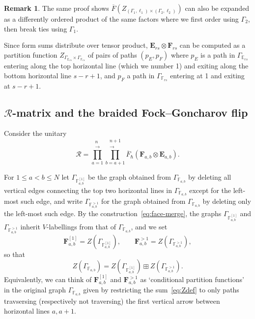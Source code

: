 \documentclass[11pt, reqno]{amsart}
\theoremstyle{definition}
\newtheorem{remark}[theorem]{Remark}
\numberwithin{equation}{section}
\def\beq{\begin{equation}}
\def\eeq{\end{equation}}
\def\Rc{\mathcal R}
\def\stgE{\mathbf{E}}
\def\stgF{\mathbf{F}}
\begin{document}
\begin{remark}
The same proof shows $\overline{F}(Z_{(\Gamma_{1},\ell_1)\times (\Gamma_{2},\ell_2)})$ can also be expanded as a differently ordered product of the same factors where we first order using $\Gamma_2$, then break ties using $\Gamma_1$.
\end{remark}

Since form sums distribute over tensor product, $\stgE_{rs}\otimes\stgF_{rs}$ can be computed as a partition function $Z_{\Gamma_{\mathbb{E}_{rs}}\times\Gamma_{\mathbb{F}_{rs}}}$ of pairs of paths $(p_E,p_F)$ where $p_E$ is a path in $\Gamma_{\mathbb{E}_{rs}}$ entering along the top horizontal line (which we number 1) and exiting along the bottom horizontal line $s-r+1$, and $p_F$ a path in $\Gamma_{\mathbb{F}_{rs}}$ entering at 1 and exiting at $s-r+1$. 

\subsection{\texorpdfstring{$\Rc$-matrix}{R-matrix} and the braided Fock--Goncharov flip}
\label{SecFG}



Consider the unitary
\beq
\label{eq:R-init2}
\Rc = \prod_{a=1}^{\substack{n \\[-2pt] \longrightarrow}} \prod_{b=a+1}^{\substack{n+1 \\[-2pt] \longrightarrow}} \overline{F}_\hbar(\stgF_{a,b} \otimes \stgE_{a,b}).
\eeq





For $1\leq a<b\leq N$ let $\Gamma_{{\mathbb{F}^{[1]}_{a,b}}}$ be the graph obtained from $\Gamma_{{\mathbb{F}_{a,b}}}$ by deleting all vertical edges connecting the top two horizontal lines in $\Gamma_{{\mathbb{F}_{a,b}}}$ except for the left-most such edge, and write $\Gamma_{{\mathbb{F}^{>1}_{a,b}}}$ for the graph obtained from 
$\Gamma_{{\mathbb{F}_{a,b}}}$ by deleting only the left-most such edge.  By the construction~\eqref{eq:face-merge}, the graphs $\Gamma_{{\mathbb{F}^{[1]}_{a,b}}}$ and $\Gamma_{{\mathbb{F}^{>1}_{a,b}}}$  inherit $V$-labellings from that of $\Gamma_{{\mathbb{F}_{a,b}}}$, and we set
$$
\stgF^{[1]}_{a,b} = Z({\Gamma_{{\mathbb{F}^{[1]}_{a,b}}}}),\qquad \stgF^{>1}_{a,b}= Z({\Gamma_{{\mathbb{F}^{>1}_{a,b}}}}),
$$
so that
$$
Z({\Gamma_{{\mathbb{F}_{a,b}}}})= Z({\Gamma_{{\mathbb{F}^{[1]}_{a,b}}}})\boxplus Z({\Gamma_{{\mathbb{F}^{>1}_{a,b}}}}).
$$
Equivalently, we can think of $\stgF^{[1]}_{a,b} $ and $\stgF^{>1}_{a,b} $ as `conditional partition functions' in the original graph $\Gamma_{{\mathbb{F}_{a,b}}}$ given by restricting the sum~\eqref{eq:Zdef} to only paths travsersing (respectively not traversing) the first vertical arrow between horizontal lines $a,a+1$.
\end{document}
